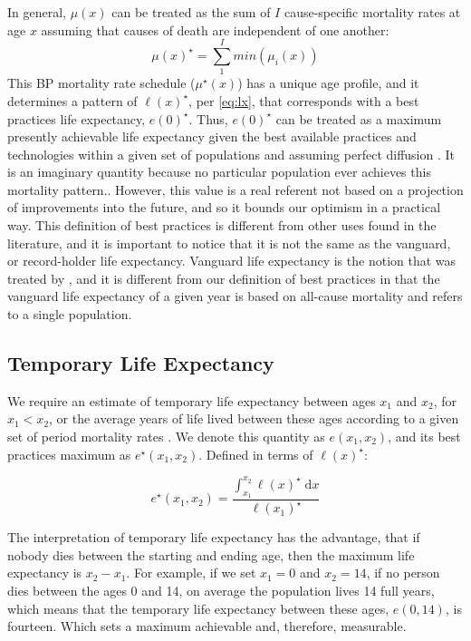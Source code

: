 \documentclass{article}
\newcommand{\dd}{\; \mathrm{d}}
\begin{document}
\begin{spacing}{1.5}
In general, $\mu(x)$ can be treated as the sum of $I$ cause-specific mortality
rates at age $x$ assuming that causes of death are independent of one another:
\begin{equation}
\label{eq:mxmin}
\mu(x)^{\star} = \sum_1^I min(\mu_i(x))
\end{equation}
This BP mortality rate schedule ($\mu^{\star}(x)$) has a unique
age profile, and it determines a pattern of $\ell(x)^{\star}$, per \eqref{eq:lx}, that corresponds with a
best practices life expectancy, $e(0)^{\star}$. Thus, $e(0)^{\star}$ can be treated as a
maximum presently achievable life expectancy given the best available
practices and technologies within a given set of populations and assuming
perfect diffusion \citep{vallin2008minimum}. It is an imaginary quantity because no particular population
ever achieves this mortality pattern.. However, this value is
a real referent not based on a projection of improvements into the future, and
so it bounds our optimism in a practical way. This definition of best practices
is different from other uses found in the literature, and it is important to
notice that it is not the same as the vanguard, or record-holder life
expectancy. Vanguard life expectancy is the notion that was treated by
\citet{oeppen2002broken}, and it is different from our definition of best
practices in that the vanguard life expectancy of a given year is based on
all-cause mortality and refers to a single population.

\subsection*{Temporary Life Expectancy}

We require an estimate of temporary life expectancy between ages
$x_1$ and $x_2$, for $x_1<x_2$, or the average years of life lived between these ages according to a given set of period mortality rates \citep{arriaga1984}. We denote this quantity as
$e(x_1,x_2)$, and its best practices maximum as $e^{\star}(x_1,x_2)$. Defined in
terms of $\ell(x)^\star$:

\begin{equation}
e^{\star}(x_1,x_2) = \frac{\int _{x_1}^{x_2} \ell(x)^\star \dd x}{\ell(x_1)^\star}
\end{equation}

The interpretation of temporary life expectancy has the advantage, that if nobody dies between the starting and ending age, then the maximum life expectancy is $x_2-x_1$.  For example, if we set $x_1=0$ and $x_2=14$, if no person dies between the ages 0 and 14, on average the population lives 14 full years, which means that the temporary life expectancy between these ages, $e(0,14)$, is fourteen. Which sets a maximum achievable and, therefore, measurable.


\end{spacing}
\end{document}
